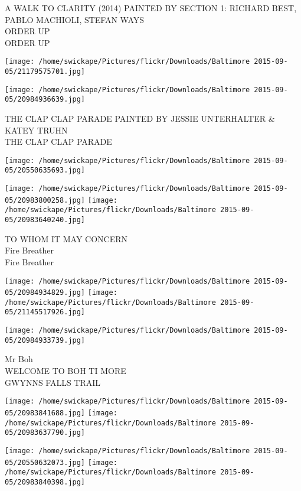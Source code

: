 \documentclass[10pt,letterpaper]{article}
\begin{document}
A WALK TO CLARITY (2014) PAINTED BY SECTION 1: RICHARD BEST, PABLO MACHIOLI, STEFAN WAYS\\
ORDER UP\\
ORDER UP
\pagebreak

\texttt{[image: /home/swickape/Pictures/flickr/Downloads/Baltimore 2015-09-05/21179575701.jpg]}

\vspace{0.25in}
\texttt{[image: /home/swickape/Pictures/flickr/Downloads/Baltimore 2015-09-05/20984936639.jpg]}

THE CLAP CLAP PARADE PAINTED BY JESSIE UNTERHALTER \& KATEY TRUHN\\
THE CLAP CLAP PARADE
\pagebreak

\texttt{[image: /home/swickape/Pictures/flickr/Downloads/Baltimore 2015-09-05/20550635693.jpg]}

\vspace{0.25in}
\texttt{[image: /home/swickape/Pictures/flickr/Downloads/Baltimore 2015-09-05/20983800258.jpg]}
\texttt{[image: /home/swickape/Pictures/flickr/Downloads/Baltimore 2015-09-05/20983640240.jpg]}

TO WHOM IT MAY CONCERN\\
Fire Breather\\
Fire Breather
\pagebreak

\texttt{[image: /home/swickape/Pictures/flickr/Downloads/Baltimore 2015-09-05/20984934829.jpg]}
\texttt{[image: /home/swickape/Pictures/flickr/Downloads/Baltimore 2015-09-05/21145517926.jpg]}

\vspace{0.25in}
\texttt{[image: /home/swickape/Pictures/flickr/Downloads/Baltimore 2015-09-05/20984933739.jpg]}

Mr Boh\\
WELCOME TO BOH TI MORE\\
GWYNNS FALLS TRAIL
\pagebreak

\texttt{[image: /home/swickape/Pictures/flickr/Downloads/Baltimore 2015-09-05/20983841688.jpg]}
\texttt{[image: /home/swickape/Pictures/flickr/Downloads/Baltimore 2015-09-05/20983637790.jpg]}

\texttt{[image: /home/swickape/Pictures/flickr/Downloads/Baltimore 2015-09-05/20550632073.jpg]}
\texttt{[image: /home/swickape/Pictures/flickr/Downloads/Baltimore 2015-09-05/20983840398.jpg]}
\end{document}
